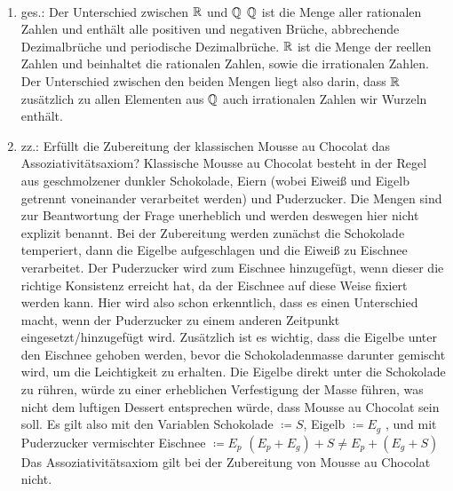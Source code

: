 \bigskip

\begin{lsg}\mbox{ }
\begin{enumerate}[label=$\mathrm{(\roman*)}$, ref=$\mathrm{\roman*}$]
\item ges.: Der Unterschied zwischen $\mathbb{R}$ und $\mathbb{Q}$ 
$\mathbb{Q}$  ist die Menge aller rationalen Zahlen und enth\"alt alle positiven und negativen Br\"uche, abbrechende Dezimalbr\"uche und periodische Dezimalbr\"uche.
$\mathbb{R}$ ist die Menge der reellen Zahlen und beinhaltet die rationalen Zahlen, sowie die irrationalen Zahlen.
Der Unterschied zwischen den beiden Mengen liegt also darin, dass $\mathbb{R}$ zus\"atzlich zu allen Elementen aus $\mathbb{Q}$  auch irrationalen Zahlen wir Wurzeln enth\"alt.
%
\item zz.: Erf\"ullt die Zubereitung der klassischen Mousse au Chocolat das Assoziativit\"atsaxiom?
Klassische Mousse au Chocolat besteht in der Regel aus geschmolzener dunkler Schokolade, Eiern (wobei Eiwei{\ss} und Eigelb getrennt voneinander verarbeitet werden) und Puderzucker. Die Mengen sind zur Beantwortung der Frage unerheblich und werden deswegen hier nicht explizit benannt.
Bei der Zubereitung werden zun\"achst die Schokolade temperiert, dann die Eigelbe aufgeschlagen und die Eiwei{\ss} zu Eischnee verarbeitet. Der Puderzucker wird zum Eischnee hinzugef\"ugt, wenn dieser die richtige Konsistenz erreicht hat, da der Eischnee auf diese Weise fixiert werden kann. Hier wird also schon erkenntlich, dass es einen Unterschied macht, wenn der Puderzucker zu einem anderen Zeitpunkt eingesetzt/hinzugef\"ugt wird. 
Zus\"atzlich ist es wichtig, dass die Eigelbe unter den Eischnee gehoben werden, bevor die Schokoladenmasse darunter gemischt wird, um die Leichtigkeit zu erhalten. Die Eigelbe direkt unter die Schokolade zu r\"uhren, w\"urde zu einer erheblichen Verfestigung der Masse f\"uhren, was nicht dem luftigen Dessert entsprechen w\"urde, dass Mousse au Chocolat sein soll.
Es gilt also mit den Variablen Schokolade $\coloneqq S$, Eigelb $\coloneqq E_{g}$ , und mit Puderzucker vermischter Eischnee $\coloneqq E_{p}$
$(E_{p} + E_{g}) + S \neq E_{p} + (E_{g} + S)$
Das Assoziativit\"atsaxiom gilt bei der Zubereitung von Mousse au Chocolat nicht.
\end{enumerate}
\end{lsg}
